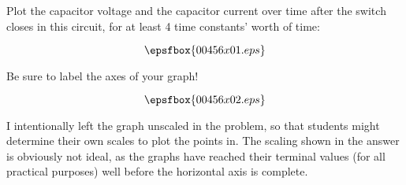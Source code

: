 

Plot the capacitor voltage and the capacitor current over time after the switch closes in this circuit, for at least 4 time constants' worth of time:

$$\epsfbox{00456x01.eps}$$

Be sure to label the axes of your graph!







$$\epsfbox{00456x02.eps}$$







I intentionally left the graph unscaled in the problem, so that students might determine their own scales to plot the points in.  The scaling shown in the answer is obviously not ideal, as the graphs have reached their terminal values (for all practical purposes) well before the horizontal axis is complete.




